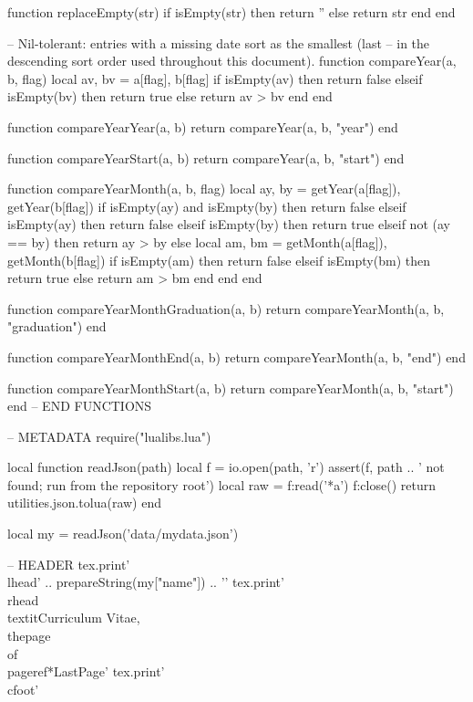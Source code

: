 \documentclass[letterpaper, 10pt]{article}
\begin{document}
\begin{luacode}
	function replaceEmpty(str)
		if isEmpty(str) then
			return ''
		else
			return str
		end
	end

	-- Nil-tolerant: entries with a missing date sort as the smallest (last
	-- in the descending sort order used throughout this document).
	function compareYear(a, b, flag)
		local av, bv = a[flag], b[flag]
		if isEmpty(av) then
			return false
		elseif isEmpty(bv) then
			return true
		else
			return av > bv
		end
	end

	function compareYearYear(a, b)
		return compareYear(a, b, "year")
	end

	function compareYearStart(a, b)
		return compareYear(a, b, "start")
	end

	function compareYearMonth(a, b, flag)
		local ay, by = getYear(a[flag]), getYear(b[flag])
		if isEmpty(ay) and isEmpty(by) then
			return false
		elseif isEmpty(ay) then
			return false
		elseif isEmpty(by) then
			return true
		elseif not (ay == by) then
			return ay > by
		else
			local am, bm = getMonth(a[flag]), getMonth(b[flag])
			if isEmpty(am) then
				return false
			elseif isEmpty(bm) then
				return true
			else
				return am > bm
			end
		end
	end

	function compareYearMonthGraduation(a, b)
		return compareYearMonth(a, b, "graduation")
	end

	function compareYearMonthEnd(a, b)
		return compareYearMonth(a, b, "end")
	end

	function compareYearMonthStart(a, b)
		return compareYearMonth(a, b, "start")
	end
	-- END FUNCTIONS

	-- METADATA
	require("lualibs.lua")

	local function readJson(path)
		local f = io.open(path, 'r')
		assert(f, path .. ' not found; run from the repository root')
		local raw = f:read('*a')
		f:close()
		return utilities.json.tolua(raw)
	end

	local my = readJson('data/mydata.json')

	-- HEADER
	tex.print{'\\lhead{' .. prepareString(my["name"]) .. '}'}
	tex.print{'\\rhead{\\textit{Curriculum Vitae, \\thepage\\ of \\pageref*{LastPage}}}'}
	tex.print{'\\cfoot{}'}


\end{luacode}
\end{document}
